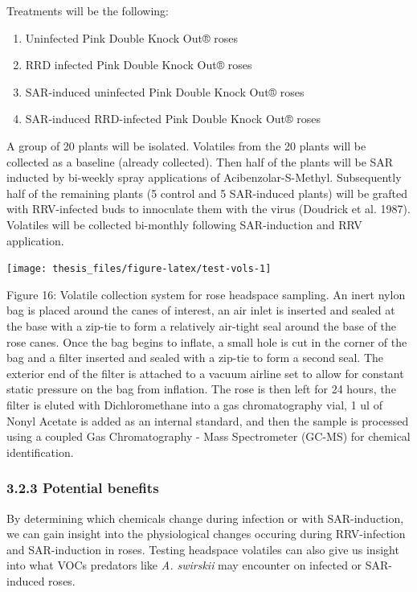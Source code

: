 \documentclass[12pt,final,CPage]{ufthesis}
\begin{document}
{  Treatments will be the following:
  \begin{enumerate}
  \def\labelenumi{\arabic{enumi}.}
  \tightlist
  \item
    Uninfected Pink Double Knock Out® roses
  \item
    RRD infected Pink Double Knock Out® roses
  \item
    SAR-induced uninfected Pink Double Knock Out® roses
  \item
    SAR-induced RRD-infected Pink Double Knock Out® roses
  \end{enumerate}
  A group of 20 plants will be isolated. Volatiles from the 20 plants will be collected as a baseline (already collected). Then half of the plants will be SAR inducted by bi-weekly spray applications of Acibenzolar-S-Methyl. Subsequently half of the remaining plants (5 control and 5 SAR-induced plants) will be grafted with RRV-infected buds to innoculate them with the virus (Doudrick et al. 1987). Volatiles will be collected bi-monthly following SAR-induction and RRV application.
  \begin{center}\texttt{[image: thesis\_files/figure-latex/test-vols-1]} \end{center}

  Figure 16: Volatile collection system for rose headspace sampling. An inert nylon bag is placed around the canes of interest, an air inlet is inserted and sealed at the base with a zip-tie to form a relatively air-tight seal around the base of the rose canes. Once the bag begins to inflate, a small hole is cut in the corner of the bag and a filter inserted and sealed with a zip-tie to form a second seal. The exterior end of the filter is attached to a vacuum airline set to allow for constant static pressure on the bag from inflation. The rose is then left for 24 hours, the filter is eluted with Dichloromethane into a gas chromatography vial, 1 ul of Nonyl Acetate is added as an internal standard, and then the sample is processed using a coupled Gas Chromatography - Mass Spectrometer (GC-MS) for chemical identification.

  \hypertarget{potential-benefits}{%
  \subsubsection{3.2.3 Potential benefits}\label{potential-benefits}}

  By determining which chemicals change during infection or with SAR-induction, we can gain insight into the physiological changes occuring during RRV-infection and SAR-induction in roses. Testing headspace volatiles can also give us insight into what VOCs predators like \emph{A. swirskii} may encounter on infected or SAR-induced roses.

}
\end{document}
